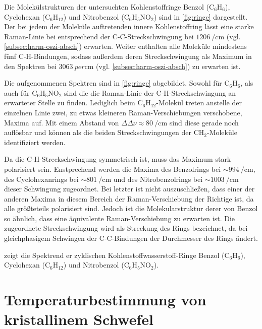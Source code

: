 \documentclass[../bericht.tex]{subfiles}
\begin{document}
      Die Molekülstrukturen der untersuchten Kohlenstoffringe Benzol ($\mathrm{C_6H_6}$), Cyclohexan ($\mathrm{C_6H_{12}}$) und Nitrobenzol ($\mathrm{C_6H_5NO_2}$) sind in \cref{fig:ringe} dargestellt. Der bei jedem der Moleküle auftretenden innere Kohlenstoffring lässt eine starke Raman-Linie bei entsprechend der C-C-Streckschwingung bei $\SI{1206}{\per\centi\meter}$ (vgl. \cref{subsec:harm-oszi-absch}) erwarten. Weiter enthalten alle Moleküle mindestens fünf C-H-Bindungen, sodass außerdem deren Streckschwingung als Maximum in den Spektren bei $\SI{3063}{per\centi\meter}$ (vgl. \cref{subsec:harm-oszi-absch}) zu erwarten ist.

      Die aufgenommenen Spektren sind in \cref{fig:ringe} abgebildet. Sowohl für $\mathrm{C_6H_6}$, als auch für $\mathrm{C_6H_5NO_2}$ sind die die Raman-Linie der C-H-Streckschwingung an erwarteter Stelle zu finden. Lediglich beim $\mathrm{C_6H_{12}}$-Molekül treten anstelle der einzelnen Linie zwei, zu etwas kleineren Raman-Verschiebungen verschobene, Maxima auf. Mit einem Abstand von $\Delta \Delta \nu \approx \SI{80}{\per\centi\meter}$ sind diese gerade noch auflösbar und können als die beiden Streckschwingungen der $\mathrm{CH_2}$-Moleküle identifiziert werden.

      Da die C-H-Streckschwingung symmetrisch ist, muss das Maximum stark polarisiert sein. Enstprechend werden die Maxima des Benzolrings bei $\sim\SI{994}{\per\centi\meter}$, des Cyclohexanrings bei $\sim\SI{801}{\per\centi\meter}$ und des Nitrobenzolrings bei $\sim\SI{1003}{\per\centi\meter}$ dieser Schwingung zugeordnet. Bei letzter ist nicht auszuschließen, dass einer der anderen Maxima in diesem Bereich der Raman-Verschiebung der Richtige ist, da alle größteteils polarisiert sind. Jedoch ist die Molekularstruktur derer von Benzol so ähnlich, dass eine äquivalente Raman-Verschiebung zu erwarten ist. Die zugeordnete Streckschwingung wird als Streckung des Rings bezeichnet, da bei gleichphasigem Schwingen der C-C-Bindungen der Durchmesser des Rings ändert.

       zeigt die Spektrend er zyklischen Kohlenstoffwasserstoff-Ringe Benzol ($\mathrm{C_6H_6}$), Cyclohexan ($\mathrm{C_6H_{12}}$) und Nitrobenzol ($\mathrm{C_6H_5NO_2}$).


  \section{Temperaturbestimmung von kristallinem Schwefel}
  \label{sec:schwefel}
\end{document}
